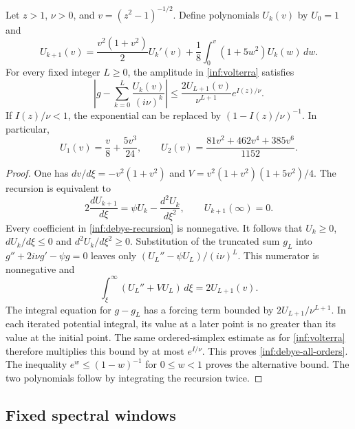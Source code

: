 \begin{lemma}\label{inf:debye-finite}
Let $z>1$, $\nu>0$, and $v=(z^2-1)^{-1/2}$. Define polynomials
$U_k(v)$ by $U_0=1$ and
\begin{equation}\label{inf:debye-recursion}
 U_{k+1}(v)=\frac{v^2(1+v^2)}2U_k'(v)
           +\frac18\int_0^v(1+5w^2)U_k(w)\,dw.
\end{equation}
For every fixed integer $L\ge0$, the amplitude in
\eqref{inf:volterra} satisfies
\begin{equation}\label{inf:debye-all-orders}
 \left|g-\sum_{k=0}^L\frac{U_k(v)}{(i\nu)^k}\right|
 \le\frac{2U_{L+1}(v)}{\nu^{L+1}}e^{I(z)/\nu}.
\end{equation}
If $I(z)/\nu<1$, the exponential can be replaced by
$(1-I(z)/\nu)^{-1}$. In particular,
\begin{equation}\label{inf:debye-polynomials}
 U_1(v)=\frac v8+\frac{5v^3}{24},\qquad
 U_2(v)=\frac{81v^2+462v^4+385v^6}{1152}.
\end{equation}
\end{lemma}
\begin{proof}
One has $dv/d\xi=-v^2(1+v^2)$ and
$V=v^2(1+v^2)(1+5v^2)/4$. The recursion is equivalent to
\[
 2\frac{dU_{k+1}}{d\xi}
 =\psi U_k-\frac{d^2U_k}{d\xi^2},\qquad U_{k+1}(\infty)=0.
\]
Every coefficient in \eqref{inf:debye-recursion} is nonnegative.
It follows that $U_k\ge0$, $dU_k/d\xi\le0$ and
$d^2U_k/d\xi^2\ge0$. Substitution of the truncated sum $g_L$ into
$g''+2i\nu g'-\psi g=0$ leaves only
$(U_L''-\psi U_L)/(i\nu)^L$. This numerator is nonnegative and
\[
 \int_\xi^\infty(U_L''+VU_L)\,d\xi=2U_{L+1}(v).
\]
The integral equation for $g-g_L$ has a forcing term bounded by
$2U_{L+1}/\nu^{L+1}$. In each iterated potential integral, its value
at a later point is no greater than its value at the initial point.
The same ordered-simplex estimate as for \eqref{inf:volterra}
therefore multiplies this bound by at most $e^{I/\nu}$. This proves
\eqref{inf:debye-all-orders}. The inequality
$e^w\le(1-w)^{-1}$ for $0\le w<1$ proves the alternative bound.
The two polynomials follow by integrating the recursion twice.
\end{proof}

\subsection{Fixed spectral windows}

